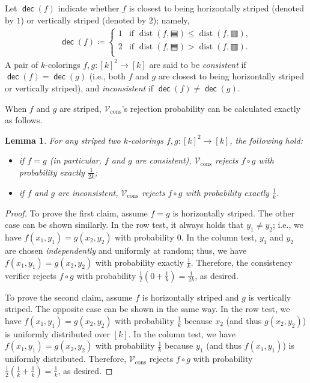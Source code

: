\documentclass[11pt,fleqn]{article}
\renewcommand{\leq}{\leqslant}
\newcommand{\defeq}{\coloneq}
\DeclareMathOperator{\rHam}{\mathrm{dist}}
\DeclareMathOperator{\dec}{\mathsf{dec}}
\newcommand{\V}{\calV}
\newcommand{\f}{f}
\newcommand{\g}{g}
\newcommand{\hor}{\squarehfill}
\newcommand{\ver}{\squarevfill}
\newcommand{\Vcons}{\V_\mathrm{cons}}
\newcommand{\calV}{\mathcal{V}}
\newtheorem{lemma}[theorem]{Lemma}
\theoremstyle{definition}
\numberwithin{equation}{section}
\begin{document}
Let $\dec(\f)$ indicate whether $\f$ is closest to being
horizontally striped (denoted by $1$) or vertically striped (denoted by $2$); namely,
\begin{align}
    \dec(\f) \defeq
    \begin{cases}
        1 & \text{if } \rHam(\f, \hor) \leq \rHam(\f, \ver), \\
        2 & \text{if } \rHam(\f, \hor) > \rHam(\f, \ver). \\
    \end{cases}
\end{align}
A pair of $k$-colorings $\f,\g \colon [k]^2 \to [k]$ are said to be
\emph{consistent} if $\dec(\f) = \dec(\g)$
(i.e., both $\f$ and $\g$ are closest to
being horizontally striped or vertically striped), and
\emph{inconsistent} if $\dec(\f) \neq \dec(\g)$.


When $\f$ and $\g$ are striped,
$\Vcons$'s rejection probability can be calculated exactly as follows.


\begin{lemma}
\label{lem:Cut-hard:cons:striped}
    For any striped two $k$-colorings $\f,\g \colon [k]^2 \to [k]$,
    the following hold\textup{:}
\begin{itemize}
    \item if $\f = \g$ (in particular, $\f$ and $\g$ are consistent),
    $\Vcons$ rejects $\f \circ \g$
    with probability exactly $\frac{1}{2k}$\textup{;}
\item if $\f$ and $\g$ are inconsistent,
    $\Vcons$ rejects $\f \circ \g$
    with probability exactly $\frac{1}{k}$.
\end{itemize}
\end{lemma}
\begin{proof} To prove the first claim, assume $\f=\g$ is horizontally striped.
The other case can be shown similarly.
In the row test, it always holds that $y_1 \neq y_2$; i.e.,
we have $\f(x_1,y_1) = \g(x_2,y_2)$ with probability $0$.
In the column test, $y_1$ and $y_2$ are chosen \emph{independently} and uniformly at random;
thus, we have $\f(x_1,y_1) = \g(x_2,y_2)$ with probability exactly $\frac{1}{k}$.
Therefore, the consistency verifier rejects $\f \circ \g$ with probability
$\frac{1}{2}\left(0 + \frac{1}{k}\right) = \frac{1}{2k}$, as desired.


To prove the second claim,
assume $\f$ is horizontally striped and $\g$ is vertically striped.
The opposite case can be shown in the same way.
In the row test,
we have $\f(x_1,y_1) = \g(x_2,y_2)$ with probability $\frac{1}{k}$
because $x_2$ (and thus $\g(x_2,y_2)$) is uniformly distributed over $[k]$.
In the column test,
we have $\f(x_1,y_1) = \g(x_2,y_2)$ with probability $\frac{1}{k}$
because $y_1$ (and thus $\f(x_1,y_1)$) is uniformly distributed.
Therefore, $\Vcons$ rejects $\f \circ \g$ with probability
$\frac{1}{2}\left(\frac{1}{k}+\frac{1}{k}\right) = \frac{1}{k}$, as desired.
\end{proof}
\end{document}
